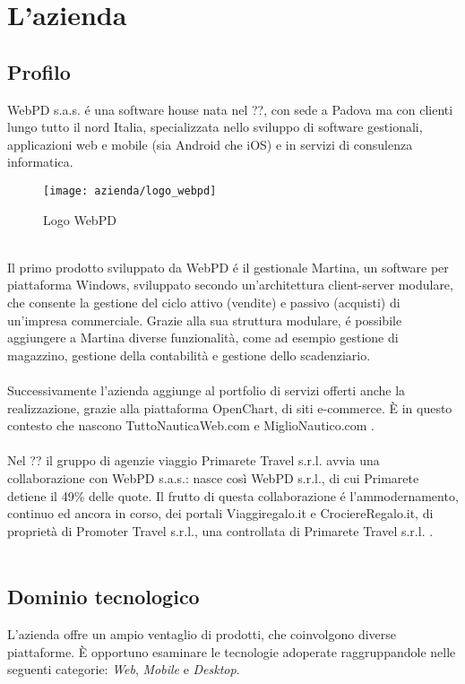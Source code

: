 
\chapter{L'azienda}
\label{cap:processi-metodologie}

\section{Profilo}
WebPD s.a.s. é una software house nata nel ??, con sede a Padova ma con clienti lungo tutto il nord Italia, specializzata nello sviluppo di software gestionali, applicazioni web e mobile (sia Android che iOS) e in servizi di consulenza informatica.\\
\begin{figure}[!h] 
	\centering 
	\texttt{[image: azienda/logo\_webpd]} 
	\caption{Logo WebPD}
\end{figure}
\\
Il primo prodotto sviluppato da WebPD é il gestionale Martina, un software per piattaforma Windows, sviluppato secondo un'architettura client-server modulare, che consente la gestione del ciclo attivo (vendite) e passivo (acquisti) di un'impresa commerciale. Grazie alla sua struttura modulare, é possibile aggiungere a Martina diverse funzionalità, come ad esempio gestione di magazzino, gestione della contabilità e gestione dello scadenziario.\\\\
Successivamente l'azienda aggiunge al portfolio di servizi offerti anche la realizzazione, grazie alla piattaforma OpenChart, di siti e-commerce. È in questo contesto che nascono TuttoNauticaWeb.com e MiglioNautico.com .\\\\
Nel ?? il gruppo di agenzie viaggio Primarete Travel s.r.l. avvia una collaborazione con WebPD s.a.s.: nasce così WebPD s.r.l., di cui Primarete detiene il 49\% delle quote. Il frutto di questa collaborazione é l'ammodernamento, continuo ed ancora in corso, dei portali Viaggiregalo.it e  CrociereRegalo.it, di proprietà di Promoter Travel s.r.l., una controllata di Primarete Travel s.r.l. .\\\\

\section{Dominio tecnologico}
L'azienda offre un ampio ventaglio di prodotti, che coinvolgono diverse piattaforme. È opportuno esaminare le tecnologie adoperate raggruppandole nelle seguenti categorie: \textit{Web}, \textit{Mobile} e \textit{Desktop}.

